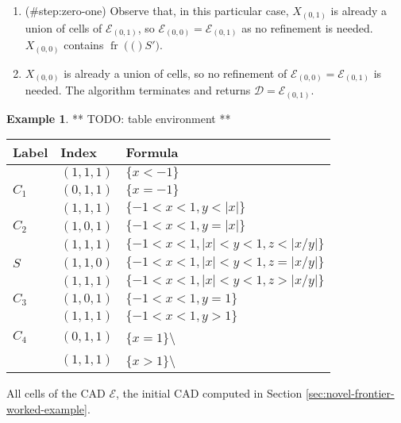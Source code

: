 \documentclass[
]{book}
\theoremstyle{definition}
\theoremstyle{definition}
\newtheorem{example}{Example}[chapter]
\theoremstyle{definition}
\theoremstyle{definition}
\theoremstyle{remark}
\begin{document}
\begin{enumerate}
\item
  (\#step:zero-one)
  Observe that, in this particular case, \(X_{(0,1)}\) is already a union of cells of \(\mathcal{E}_{(0,1)}\), so \(\mathcal{E}_{(0,0)} = \mathcal{E}_{(0,1)}\) as no refinement is needed.
  \(X_{(0,0)}\) contains \({\operatorname{fr} \left( ( \right)}S')\).
\item
  \(X_{(0,0)}\) is already a union of cells, so no refinement of \(\mathcal{E}_{(0,0)} = \mathcal{E}_{(0,1)}\) is needed. The algorithm terminates and returns \(\mathcal{D} = \mathcal{E}_{(0,1)}\).
\end{enumerate}

\begin{example}
\protect\hypertarget{exm:cells-of-e}{}\label{exm:cells-of-e}** TODO: table environment **

\begin{longtable}[]{@{}lll@{}}
\toprule
Label & Index & Formula\tabularnewline
\midrule
\endhead
& \((1,1,1)\) & \(\{ x < -1 \}\)\tabularnewline
\(C_1\) & \((0,1,1)\) & \(\{ x = -1 \}\)\tabularnewline
& \((1,1,1)\) & \(\{ -1 < x < 1, y < \vert x \vert \}\)\tabularnewline
\(C_2\) & \((1,0,1)\) & \(\{ -1 < x < 1, y = \vert x \vert \}\)\tabularnewline
& \((1,1,1)\) & \(\{ -1 < x < 1, \vert x \vert < y < 1, z < \vert x/y \vert \}\)\tabularnewline
\(S\) & \((1,1,0)\) & \(\{ -1 < x < 1, \vert x \vert < y < 1, z = \vert x/y \vert \}\)\tabularnewline
& \((1,1,1)\) & \(\{ -1 < x < 1, \vert x \vert < y < 1, z > \vert x/y \vert \}\)\tabularnewline
\(C_3\) & \((1,0,1)\) & \(\{ -1 < x < 1, y = 1 \}\)\tabularnewline
& \((1,1,1)\) & \(\{ -1 < x < 1, y > 1 \}\)\tabularnewline
\(C_4\) & \((0,1,1)\) & \(\{ x = 1 \}\)\textbackslash{}\tabularnewline
& \((1,1,1)\) & \(\{ x > 1 \}\)\textbackslash{}\tabularnewline
\bottomrule
\end{longtable}

All cells of the CAD \(\mathcal{E}\), the initial CAD computed in Section \ref{sec:novel-frontier-worked-example}.
\end{example}
\end{document}
